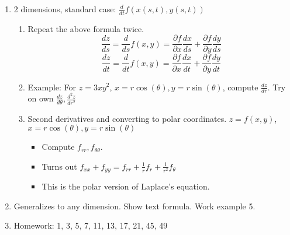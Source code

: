\documentclass{article}
\begin{document}
\begin{enumerate}
\item 2 dimensions, standard case: $\frac{d}{dt} f(x(s,t), y(s,t))$
\begin{enumerate}
\item Repeat the above formula twice.
\[
\frac{dz}{ds} = \frac{d}{ds} f(x,y) = \frac{\partial f}{\partial x} \frac{dx}{ds} + \frac{\partial f}{\partial y} \frac{dy}{ds}
\]
\[
\frac{dz}{dt} = \frac{d}{dt} f(x,y) = \frac{\partial f}{\partial x} \frac{dx}{dt} + \frac{\partial f}{\partial y} \frac{dy}{dt}
\]
\item Example: For $z=3xy^2$, $x=r\cos(\theta), y=r\sin(\theta)$, compute $\frac{dz}{dr}$. Try on own $\frac{dz}{d\theta}, \frac{d^2z}{dr^2}$
\item Second derivatives and converting to polar coordinates. $z=f(x,y)$, $x=r\cos(\theta), y=r\sin(\theta)$
\begin{itemize}
\item Compute $f_{rr}, f_{\theta \theta}$.
\item Turns out $f_{xx}+f_{yy}=f_{rr}+\frac{1}{r}f_r + \frac{1}{r^2}f_{\theta}$
\item This is the polar version of Laplace's equation.
\end{itemize}
\end{enumerate}

\item Generalizes to any dimension. Show text formula. Work example 5.

\item Homework: 1, 3, 5, 7, 11, 13, 17, 21, 45, 49

\end{enumerate}
\end{document}
